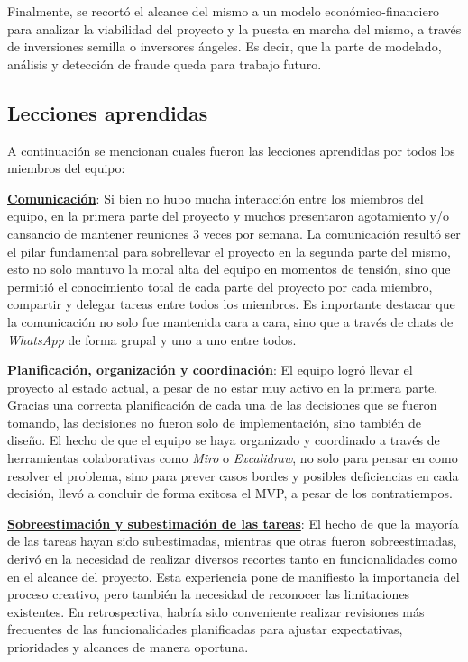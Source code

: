 Finalmente, se recortó el alcance del mismo a un modelo 
económico-financiero para analizar la viabilidad del proyecto y la puesta en marcha del mismo, a través de
inversiones semilla o inversores ángeles. Es decir, que la parte de modelado, análisis y detección de fraude queda para 
trabajo futuro.

\subsection{Lecciones aprendidas}

A continuación se mencionan cuales fueron las lecciones aprendidas por todos los miembros del equipo:

\vspace{0.25cm}

\textbf{\underline{Comunicación}}: Si bien no hubo mucha interacción entre los miembros del equipo, en la primera parte 
del proyecto y muchos presentaron agotamiento y/o cansancio de mantener reuniones 3 veces por semana. La comunicación
resultó ser el pilar fundamental para sobrellevar el proyecto en la segunda parte del mismo, esto no solo mantuvo la
moral alta del equipo en momentos de tensión, sino que permitió el conocimiento total de cada parte del proyecto por cada miembro,
compartir y delegar tareas entre todos los miembros. Es importante destacar que la comunicación no solo fue mantenida cara
a cara, sino que a través de chats de \textit{WhatsApp} de forma grupal y uno a uno entre todos.

\vspace{0.25cm}

\textbf{\underline{Planificación, organización y coordinación}}: El equipo logró llevar el proyecto al estado actual, 
a pesar de no estar muy activo en la primera parte. Gracias una correcta planificación de cada una de las decisiones que 
se fueron tomando, las decisiones no fueron solo de implementación, sino también de diseño. El hecho de que el equipo se haya
organizado y coordinado a través de herramientas colaborativas como \textit{Miro} o \textit{Excalidraw}, no solo para pensar 
en como resolver el problema, sino para prever casos bordes y posibles deficiencias en cada decisión, llevó a concluir de 
forma exitosa el MVP, a pesar de los contratiempos.

\vspace{0.25cm}

\textbf{\underline{Sobreestimación y subestimación de las tareas}}: El hecho de que la mayoría de las tareas hayan sido subestimadas,
mientras que otras fueron sobreestimadas, derivó en la necesidad de realizar diversos recortes tanto en funcionalidades como en el
alcance del proyecto. Esta experiencia pone de manifiesto la importancia del proceso creativo,
pero también la necesidad de reconocer las limitaciones existentes. En retrospectiva, habría sido conveniente realizar revisiones
más frecuentes de las funcionalidades planificadas para ajustar expectativas, prioridades y alcances de manera oportuna.

